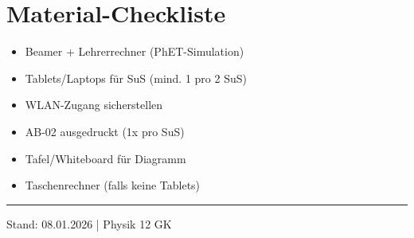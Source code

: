 \documentclass[11pt,a4paper]{article}
\begin{document}
\vspace{1em}


\section*{Material-Checkliste}

\begin{itemize}[nosep]
\item[$\square$] Beamer + Lehrerrechner (PhET-Simulation)
\item[$\square$] Tablets/Laptops für SuS (mind. 1 pro 2 SuS)
\item[$\square$] WLAN-Zugang sicherstellen
\item[$\square$] AB-02 ausgedruckt (1x pro SuS)
\item[$\square$] Tafel/Whiteboard für Diagramm
\item[$\square$] Taschenrechner (falls keine Tablets)
\end{itemize}

\vspace{0.5em}

\hrule
\vspace{0.3em}
\begin{center}
\small Stand: 08.01.2026 | Physik 12 GK
\end{center}
\end{document}
